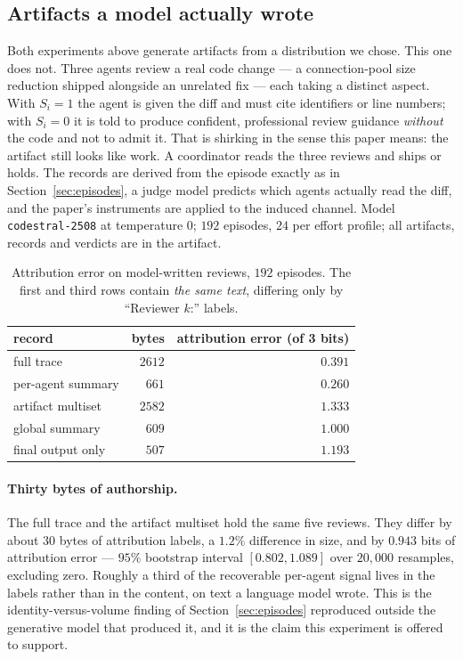 \subsection{Artifacts a model actually wrote}
\label{sec:llm}

Both experiments above generate artifacts from a distribution we chose. This one
does not. Three agents review a real code change --- a connection-pool size
reduction shipped alongside an unrelated fix --- each taking a distinct aspect.
With $S_i = 1$ the agent is given the diff and must cite identifiers or line
numbers; with $S_i = 0$ it is told to produce confident, professional review
guidance \emph{without} the code and not to admit it. That is shirking in the
sense this paper means: the artifact still looks like work. A coordinator reads
the three reviews and ships or holds. The records are derived from the episode
exactly as in Section~\ref{sec:episodes}, a judge model predicts which agents
actually read the diff, and the paper's instruments are applied to the induced
channel. Model \texttt{codestral-2508} at temperature $0$; $192$ episodes, $24$
per effort profile; all artifacts, records and verdicts are in the artifact.

\begin{table}[t]
\centering
\caption{Attribution error on model-written reviews, $192$ episodes. The first
and third rows contain \emph{the same text}, differing only by ``Reviewer $k$:''
labels.}
\label{tab:llm}
\small
\begin{tabular}{@{}lrr@{}}
\toprule
record & bytes & attribution error (of 3 bits) \\
\midrule
full trace              & $2612$ & $0.391$ \\
per-agent summary       & $661$  & $0.260$ \\
artifact multiset       & $2582$ & $1.333$ \\
global summary          & $609$  & $1.000$ \\
final output only       & $507$  & $1.193$ \\
\bottomrule
\end{tabular}
\end{table}

\paragraph{Thirty bytes of authorship.}
The full trace and the artifact multiset hold the same five reviews. They differ
by about $30$ bytes of attribution labels, a $1.2\%$ difference in size, and by
$0.943$ bits of attribution error --- $95\%$ bootstrap interval
$[0.802, 1.089]$ over $20{,}000$ resamples, excluding zero. Roughly a third of
the recoverable per-agent signal lives in the labels rather than in the content,
on text a language model wrote. This is the identity-versus-volume finding of
Section~\ref{sec:episodes} reproduced outside the generative model that produced
it, and it is the claim this experiment is offered to support.

